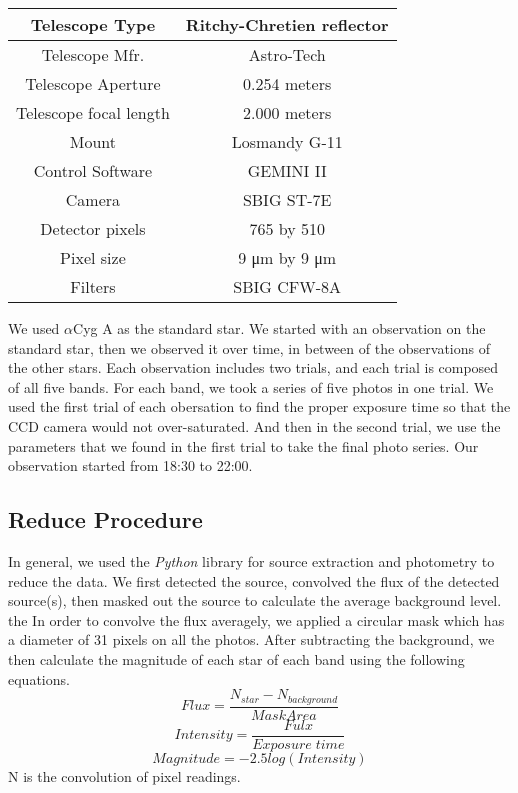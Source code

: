 \documentclass[]{article}
\begin{document}
\begin{center}
\begin{tabular}{ |c|c| } 
 \hline
Telescope Type & Ritchy-Chretien reflector \\
\hline
Telescope Mfr. & Astro-Tech \\
\hline
Telescope Aperture & 0.254 meters \\
\hline
Telescope focal length & 2.000 meters \\
\hline
Mount & Losmandy G-11 \\
\hline
Control Software & GEMINI II \\
\hline
Camera & SBIG ST-7E \\
\hline
Detector pixels & 765 by 510 \\
\hline
Pixel size & 9 μm by 9 μm \\
\hline
Filters & SBIG CFW-8A \\
\hline
\end{tabular}
\end{center}

We used $\alpha$Cyg A as the standard star. We started with an observation on the standard star, then we observed it over time, in between of the observations of the other stars. Each observation includes two trials, and each trial is composed of all five bands. For each band, we took a series of five photos in one trial. We used the first trial of each obersation to find the proper exposure time so that the CCD camera would not over-saturated. And then in the second trial, we use the parameters that we found in the first trial to take the final photo series. Our observation started from 18:30 to 22:00. 

\subsection*{Reduce Procedure}
In general, we used the \textit{Python} library for source extraction and photometry  to reduce the data. 
We first detected the source, convolved the flux of the detected source(s), then masked out the source to calculate the average background level. the In order to convolve the flux averagely, we applied a circular mask which has a diameter of 31 pixels on all the photos. After subtracting the background, we then calculate the magnitude of each star of each band using the following equations.
\begin{equation}
\label{eqn:EQ1} 
  Flux = \frac{N_{star}-N_{background}}{Mask Area}
\end{equation} 
\begin{equation}
\label{eqn:EQ2} 
 Intensity = \frac{Fulx}{Exposure\; time}
\end{equation} 
\begin{equation}
\label{eqn:EQ3} 
  Magnitude = -2.5log(Intensity)
\end{equation}
N is the convolution of pixel readings. 
\end{document}
